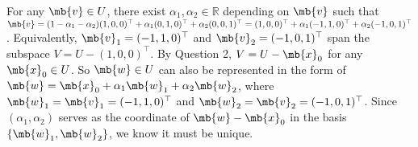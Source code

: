 \begin{exercise}
\begin{enumerate}
      \begin{solution}
        For any $\mb{v} \in U$, there exist $\alpha_1, \alpha_2 \in \mathbb{R}$ depending on $\mb{v}$ such that $\mb{v} = (1- \alpha_1- \alpha_2) (1,0,0)^\top + \alpha_1 (0,1,0)^\top + \alpha_2 (0,0,1)^\top = (1,0,0)^\top + \alpha_1 (-1,1,0)^\top + \alpha_2 (-1,0,1)^\top$. Equivalently, $\mb{v}_1 = (-1,1,0)^\top$ and $\mb{v}_2 = (-1,0,1)^\top$ span the subspace $V = U - (1,0,0)^\top$. By Question 2, $V = U - \mb{x}_0$ for any $\mb{x}_0 \in U$. So $\mb{w} \in U$ can also be represented in the form of $\mb{w} = \mb{x}_0 + \alpha_1 \mb{w}_1 + \alpha_2 \mb{w}_2$, where $\mb{w}_1 = \mb{v}_1 = (-1,1,0)^\top$ and $\mb{w}_2 = \mb{v}_2 = (-1,0,1)^\top$. Since $(\alpha_1, \alpha_2)$ serves as the coordinate of $\mb{w}-\mb{x}_0$ in the basis $\{\mb{w}_1, \mb{w}_2\}$, we know it must be unique.
      \end{solution}
  \end{enumerate}
\end{exercise}
\newpage



